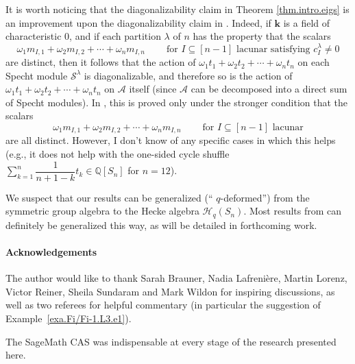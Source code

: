 \documentclass[numbers=enddot,12pt,final,onecolumn,notitlepage]{scrartcl}%
\theoremstyle{definition}
\newenvironment{noncompile}{}{}
\let\sumnonlimits\sum
\renewcommand{\sum}{\sumnonlimits\limits}
\begin{document}
\begin{noncompile}
It is worth noticing that the diagonalizability claim in Theorem
\ref{thm.intro.eigs} is an improvement upon the diagonalizability claim in
\cite[Theorem 12.3]{s2b1}. Indeed, if $\mathbf{k}$ is a field of
characteristic $0$, and if each partition $\lambda$ of $n$ has the property
that the scalars%
\[
\omega_{1}m_{I,1}+\omega_{2}m_{I,2}+\cdots+\omega_{n}m_{I,n}%
\ \ \ \ \ \ \ \ \ \ \text{for }I\subseteq\left[  n-1\right]  \text{ lacunar
satisfying }c_{I}^{\lambda}\neq0
\]
are distinct, then it follows that the action of $\omega_{1}t_{1}+\omega
_{2}t_{2}+\cdots+\omega_{n}t_{n}$ on each Specht module $\mathcal{S}^{\lambda
}$ is diagonalizable, and therefore so is the action of $\omega_{1}%
t_{1}+\omega_{2}t_{2}+\cdots+\omega_{n}t_{n}$ on $\mathcal{A}$ itself (since
$\mathcal{A}$ can be decomposed into a direct sum of Specht modules). In
\cite[Theorem 12.3]{s2b1}, this is proved only under the stronger condition
that the scalars%
\[
\omega_{1}m_{I,1}+\omega_{2}m_{I,2}+\cdots+\omega_{n}m_{I,n}%
\ \ \ \ \ \ \ \ \ \ \text{for }I\subseteq\left[  n-1\right]  \text{ lacunar}%
\]
are all distinct. However, I don't know of any specific cases in which this
helps (e.g., it does not help with the one-sided cycle shuffle $\sum_{k=1}%
^{n}\dfrac{1}{n+1-k}t_{k}\in\mathbb{Q}\left[  S_{n}\right]  $ for $n=12$).
\end{noncompile}

We suspect that our results can be generalized (\textquotedblleft%
$q$-deformed\textquotedblright) from the symmetric group algebra to the Hecke
algebra $\mathcal{H}_{q}\left(  S_{n}\right)  $. Most results from \cite{s2b1}
can definitely be generalized this way, as will be detailed in forthcoming work.

\paragraph{Acknowledgements}

The author would like to thank Sarah Brauner, Nadia Lafreni\`{e}re, Martin
Lorenz, Victor Reiner, Sheila Sundaram and Mark Wildon for inspiring discussions,
as well as two referees for helpful commentary
(in particular the suggestion of Example~\ref{exa.Fi/Fi-1.L3.e1}).

\begin{noncompile}
The SageMath CAS \cite{sagemath} was indispensable at every stage of the
research presented here.
\end{noncompile}
\end{document}

